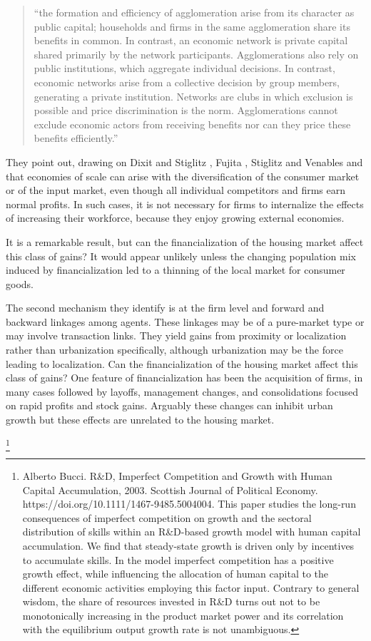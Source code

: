 \documentclass[a4paper]{article}
\theoremstyle{definition}
\theoremstyle{plain}
\begin{document}
{\begin{quotation}
``the formation and efficiency of agglomeration arise from its character as public capital; households and firms in the same agglomeration share its benefits in common. In contrast, an economic network is private capital shared primarily by the network participants. Agglomerations also rely on public institutions, which aggregate individual decisions. In contrast, economic networks arise from a collective decision by group members, generating a private institution. Networks are clubs in which exclusion is possible and price discrimination is the norm. Agglomerations cannot exclude economic actors from receiving benefits nor can they price these benefits efficiently.''
\end{quotation}
They point out, drawing on Dixit and Stiglitz \cite{AvinashK.Dixit1977MCaO},  Fujita \cite{fujitaMonopolisticCompetitionModel1988}, Stiglitz and Venables and \cite{fujitaSpatialEconomyCities1999} that economies of scale  can arise with the diversification of the consumer market or of the input market, even though all individual competitors and firms earn normal profits. In such cases, it is not necessary for firms to internalize the effects of increasing their workforce, because they enjoy growing external economies.

 It is a remarkable result, but can the financialization of the housing market affect this class of  gains? It would appear unlikely unless the changing population mix induced by financialization led to a thinning of the local market for consumer goods. 

 The second mechanism they identify is at the firm level and forward and backward linkages among agents. These linkages may be of a pure-market type or may involve transaction links. They yield gains from proximity or localization rather than urbanization specifically, although urbanization may be the force leading to localization. Can the financialization of the housing market affect this class of gains? One feature of financialization has been the acquisition of firms, in many cases followed by layoffs, management changes, and consolidations focused on rapid profits and stock gains. Arguably these changes can inhibit urban growth but these effects are unrelated to the housing market.

 \footnote{Alberto Bucci.  R\&D, Imperfect Competition and Growth with Human Capital Accumulation, 2003. Scottish Journal of Political Economy. https://doi.org/10.1111/1467-9485.5004004. This paper studies the long-run consequences of imperfect competition on growth and the sectoral distribution of skills within an R\&D-based growth model with human capital accumulation. We find that steady-state growth is driven only by incentives to accumulate skills. In the model imperfect competition has a positive growth effect, while influencing the allocation of human capital to the different economic activities employing this factor input. Contrary to general wisdom, the share of resources invested in R\&D turns out not to be monotonically increasing in the product market power and its correlation with the equilibrium output growth rate is not unambiguous.}

}
\end{document}
